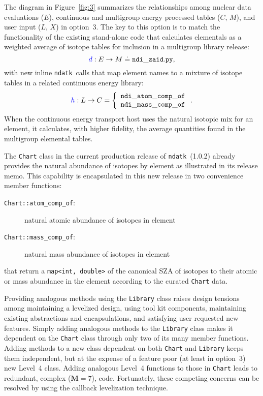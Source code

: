 \documentclass[12pt]{lamemo}
\newcommand{\ndatk}{\texttt{ndatk}}
\begin{document}
The diagram in Figure~\ref{fig:3} summarizes the relationships among
nuclear data evaluations ($E$), continuous and multigroup energy
processed tables ($C$, $M$), and user input ($L$, $X$) in option~3.
The key to this option is to match the functionality of the existing
stand-alone code that calculates elementals as a weighted average of
isotope tables for inclusion in a multigroup library release:
\[
\textcolor{blue}{d}:E \rightarrow M \doteq \mathtt{ndi\_zaid.py},
\]
with new inline \ndatk\ calls that map element names to a mixture of
isotope tables in a related continuous energy library:
\[
\textcolor{blue}{h}:L \rightarrow C = \left\{ \begin{array}{l}
    \mathtt{ndi\_atom\_comp\_of} \\
    \mathtt{ndi\_mass\_comp\_of}
    \end{array} \right. .
\]
When the continuous energy transport host uses the natural isotopic
mix for an element, it calculates, with higher fidelity, the average
quantities found in the multigroup elemental tables.  

The \texttt{Chart} class in the current production release of \ndatk\
(1.0.2) already provides the natural abundance of isotopes by element
as illustrated in its release memo\cite[Appendix~II]{gray14}.  This
capability is encapsulated in this new release in two convenience
member functions:
\begin{description}
\item[\texttt{Chart::atom\_comp\_of}: ] natural atomic abundance of
  isotopes in element
\item[\texttt{Chart::mass\_comp\_of}: ] natural mass abundance of
  isotopes in element
\end{description}
that return a \texttt{map<int, double>} of the canonical SZA of
isotopes to their atomic or mass abundance in the element according to
the curated \texttt{Chart} data.

Providing analogous methods using the \texttt{Library} class raises
design tensions among maintaining a levelized design\cite{lakos96},
using tool kit components, maintaining existing\cite{gray14}
abstractions and encapsulations, and satisfying user requested new
features.  Simply adding analogous methods to the \texttt{Library}
class makes it dependent on the \texttt{Chart} class through only two
of its many member functions.  Adding methods to a new class dependent
on both \texttt{Chart} and \texttt{Library} keeps them independent,
but at the expense of a feature poor (at least in option~3) new
Level~4 class.  Adding analogous Level~4 functions to those in
\texttt{Chart} leads to redundant, complex\cite{wiki} ($\mathbf{M} =
7$), code.  Fortunately, these competing concerns can be resolved by
using the callback levelization technique.
\end{document}
